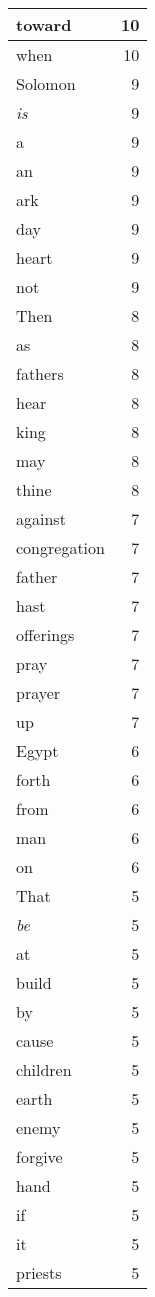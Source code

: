 \begin{center}
\begin{longtable}{l|r}
toward & 10 \\ \hline
when & 10 \\ \hline
Solomon & 9 \\ \hline
\emph{is} & 9 \\ \hline
a & 9 \\ \hline
an & 9 \\ \hline
ark & 9 \\ \hline
day & 9 \\ \hline
heart & 9 \\ \hline
not & 9 \\ \hline
Then & 8 \\ \hline
as & 8 \\ \hline
fathers & 8 \\ \hline
hear & 8 \\ \hline
king & 8 \\ \hline
may & 8 \\ \hline
thine & 8 \\ \hline
against & 7 \\ \hline
congregation & 7 \\ \hline
father & 7 \\ \hline
hast & 7 \\ \hline
offerings & 7 \\ \hline
pray & 7 \\ \hline
prayer & 7 \\ \hline
up & 7 \\ \hline
Egypt & 6 \\ \hline
forth & 6 \\ \hline
from & 6 \\ \hline
man & 6 \\ \hline
on & 6 \\ \hline
That & 5 \\ \hline
\emph{be} & 5 \\ \hline
at & 5 \\ \hline
build & 5 \\ \hline
by & 5 \\ \hline
cause & 5 \\ \hline
children & 5 \\ \hline
earth & 5 \\ \hline
enemy & 5 \\ \hline
forgive & 5 \\ \hline
hand & 5 \\ \hline
if & 5 \\ \hline
it & 5 \\ \hline
priests & 5 \\ \hline

\end{longtable}
\end{center}
